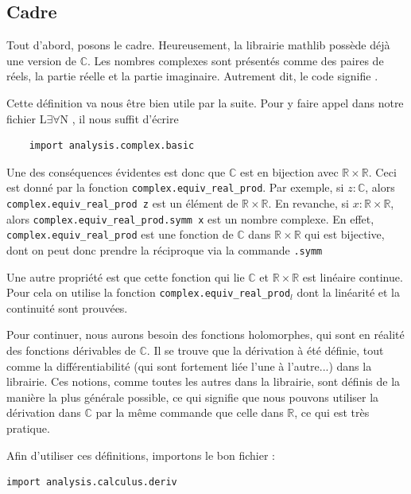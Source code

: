 \documentclass[a4paper, 11pt, twoside]{report}
\newcommand\R{\mathbb{R}}
\newcommand\C{\mathbb{C}}
\newcommand{\LEAN}{L$\exists\forall$N }
\begin{document}
\subsection{Cadre}

Tout d'abord, posons le cadre. Heureusement, la librairie mathlib possède déjà une version de $\C$. Les nombres complexes sont présentés comme des paires de réels, la partie réelle et la partie imaginaire. Autrement dit, le code \fbox{$z : \C$} signifie \fbox{$x\, y : \R, z = (x,y)$}. 

Cette définition va nous être bien utile par la suite. Pour y faire appel dans notre fichier \LEAN, il nous suffit d'écrire 

\begin{lstlisting}
	import analysis.complex.basic 
\end{lstlisting}


Une des conséquences évidentes est donc que $\C$ est en bijection avec $\R\times \R$. Ceci est donné par la fonction \verb|complex.equiv_real_prod|. Par exemple, si $z:\C$, alors \verb|complex.equiv_real_prod z| est un élément de $\R\times \R$. En revanche, si $x : \R\times\R$, alors \verb|complex.equiv_real_prod.symm x| est un nombre complexe. En effet, \verb|complex.equiv_real_prod| est une fonction de $\C$ dans $\R\times\R$ qui est bijective, dont on peut donc prendre la réciproque via la commande \verb|.symm|

Une autre propriété est que cette fonction qui lie $\C$ et $\R\times\R$ est linéaire continue. Pour cela on utilise la fonction \verb|complex.equiv_real_prod|$_l$ dont la linéarité et la continuité sont prouvées.

\medskip

Pour continuer, nous aurons besoin des fonctions holomorphes, qui sont en réalité des fonctions dérivables de $\C$. Il se trouve que la dérivation à été définie, tout comme la différentiabilité (qui sont fortement liée l'une à l'autre...) dans la librairie. Ces notions, comme toutes les autres dans la librairie, sont définis de la manière la plus générale possible, ce qui signifie que nous pouvons utiliser la dérivation dans $\C$ par la même commande que celle dans $\R$, ce qui est très pratique. 

Afin d'utiliser ces définitions, importons le bon fichier :

\begin{lstlisting}
import analysis.calculus.deriv 
\end{lstlisting}
\end{document}
